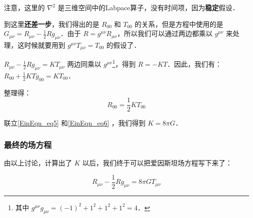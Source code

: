 注意，这里的 $\nabla^2$ 是三维空间中的Labpace算子，没有时间项，因为\textbf{稳定}假设．


到这里\textbf{还差一步}，我们得出的是 $R_{00}$ 和 $T_{00}$ 的关系，但是方程中使用的是 $G_{\mu\nu}=R_{\mu\nu}-\frac{1}{2}Rg_{\mu\nu}$．由于 $R=g^{\mu\nu}R_{\mu\nu}$，所以我们可以通过两边都乘以 $g^{\mu\nu}$ 来处理，这时候就要用到 $g^{\mu\nu}T_{\mu\nu}=T_{00}$ 的假设了．

$R_{\mu\nu}-\frac{1}{2}Rg_{\mu\nu}=KT_{\mu\nu}$ 两边同乘以 $g^{\mu\nu}$\footnote{其中 $g^{\mu\nu}g_{\mu\nu}=(-1)^2+1^2+1^2+1^2=4$．}，得到 $R=-KT$．因此，我们有：$R_{00}+\frac{1}{2}KTg_{00}=KT_{00}$．



整理得：
\begin{equation}\label{EinEqn_eq6}
R_{00}=\frac{1}{2}KT_{00}
\end{equation}

联立\autoref{EinEqn_eq5} 和\autoref{EinEqn_eq6} ，我们得到 $K=8\pi G$．

\subsubsection{最终的场方程}

由以上讨论，计算出了 $K$ 以后，我们终于可以把爱因斯坦场方程写下来了：

\begin{equation}
R_{\mu\nu}-\frac{1}{2}Rg_{\mu\nu}=8\pi GT_{\mu\nu}
\end{equation}















